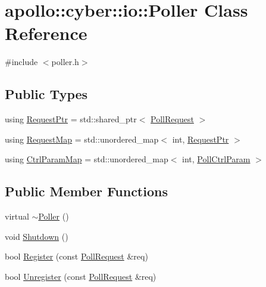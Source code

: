 \hypertarget{classapollo_1_1cyber_1_1io_1_1Poller}{\section{apollo\-:\-:cyber\-:\-:io\-:\-:Poller Class Reference}
\label{classapollo_1_1cyber_1_1io_1_1Poller}
}


{\ttfamily \#include $<$poller.\-h$>$}

\subsection*{Public Types}
\begin{DoxyCompactItemize}
\item 
using \hyperlink{classapollo_1_1cyber_1_1io_1_1Poller_afca2e09142da5f57cfca966402953bf2}{Request\-Ptr} = std\-::shared\-\_\-ptr$<$ \hyperlink{structapollo_1_1cyber_1_1io_1_1PollRequest}{Poll\-Request} $>$
\item 
using \hyperlink{classapollo_1_1cyber_1_1io_1_1Poller_a46cf3c8b1cd0c34c0daf7dd076cddc63}{Request\-Map} = std\-::unordered\-\_\-map$<$ int, \hyperlink{classapollo_1_1cyber_1_1io_1_1Poller_afca2e09142da5f57cfca966402953bf2}{Request\-Ptr} $>$
\item 
using \hyperlink{classapollo_1_1cyber_1_1io_1_1Poller_a8b5069a91f056c7b473bcfd02ff2aaad}{Ctrl\-Param\-Map} = std\-::unordered\-\_\-map$<$ int, \hyperlink{structapollo_1_1cyber_1_1io_1_1PollCtrlParam}{Poll\-Ctrl\-Param} $>$
\end{DoxyCompactItemize}
\subsection*{Public Member Functions}
\begin{DoxyCompactItemize}
\item 
virtual \hyperlink{classapollo_1_1cyber_1_1io_1_1Poller_a3d4410cd424c87e76f258e3b41d37ab5}{$\sim$\-Poller} ()
\item 
void \hyperlink{classapollo_1_1cyber_1_1io_1_1Poller_a0eec83658cd929f9c2515d5779e3e129}{Shutdown} ()
\item 
bool \hyperlink{classapollo_1_1cyber_1_1io_1_1Poller_ae403021b629890022daceda8640c5a9c}{Register} (const \hyperlink{structapollo_1_1cyber_1_1io_1_1PollRequest}{Poll\-Request} \&req)
\item 
bool \hyperlink{classapollo_1_1cyber_1_1io_1_1Poller_a3a1f73729383b8840bc797f83e3f9518}{Unregister} (const \hyperlink{structapollo_1_1cyber_1_1io_1_1PollRequest}{Poll\-Request} \&req)
\end{DoxyCompactItemize}
